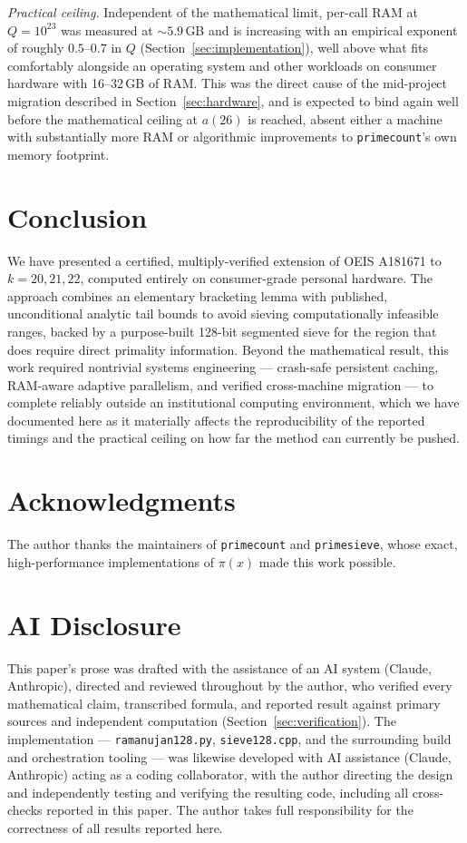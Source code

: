 \documentclass[11pt]{amsart}
\newcommand{\pcount}{\pi}
\begin{document}
\emph{Practical ceiling.} Independent of the mathematical limit,
per-call RAM at $Q=10^{23}$ was measured at $\sim\!5.9$\,GB and is
increasing with an empirical exponent of roughly $0.5$--$0.7$ in $Q$
(Section~\ref{sec:implementation}), well above what fits comfortably
alongside an operating system and other workloads on consumer hardware
with 16--32\,GB of RAM. This was the direct cause of the mid-project
migration described in Section~\ref{sec:hardware}, and is expected to
bind again well before the mathematical ceiling at $a(26)$ is reached,
absent either a machine with substantially more RAM or algorithmic
improvements to \texttt{primecount}'s own memory footprint.

\section{Conclusion}

We have presented a certified, multiply-verified extension of OEIS
A181671 to $k=20,21,22$, computed entirely on
consumer-grade personal hardware. The approach combines an elementary
bracketing lemma with published, unconditional analytic tail bounds to
avoid sieving computationally infeasible ranges, backed by a
purpose-built 128-bit segmented sieve for the region that does require
direct primality information. Beyond the mathematical result, this work
required nontrivial systems engineering --- crash-safe persistent
caching, RAM-aware adaptive parallelism, and verified cross-machine
migration --- to complete reliably outside an institutional computing
environment, which we have documented here as it materially affects the
reproducibility of the reported timings and the practical ceiling on
how far the method can currently be pushed.

\section*{Acknowledgments}

The author thanks the maintainers of \texttt{primecount} and
\texttt{primesieve}, whose exact, high-performance implementations of
$\pcount(x)$ made this work possible.

\section*{AI Disclosure}

This paper's prose was drafted with the assistance of an AI system
(Claude, Anthropic), directed and reviewed throughout by the author, who
verified every mathematical claim, transcribed formula, and reported
result against primary sources and independent computation
(Section~\ref{sec:verification}). The implementation ---
\texttt{ramanujan128.py}, \texttt{sieve128.cpp}, and the surrounding
build and orchestration tooling --- was likewise developed with AI
assistance (Claude, Anthropic) acting as a coding collaborator, with the
author directing the design and independently testing and verifying the
resulting code, including all cross-checks reported in this paper. The
author takes full responsibility for the correctness of all results
reported here.
\end{document}
